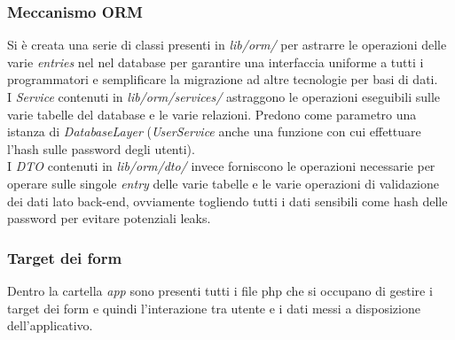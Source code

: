 \subsubsection{Meccanismo ORM}
Si è creata una serie di classi presenti in \textit{lib/orm/} per astrarre le operazioni delle varie \textit{entries} nel nel database per garantire una interfaccia uniforme a tutti i programmatori e semplificare la migrazione ad altre tecnologie per basi di dati.\\
I \textit{Service} contenuti in \textit{lib/orm/services/} astraggono le operazioni eseguibili sulle varie tabelle del database e le varie relazioni. Predono come parametro una istanza di \textit{DatabaseLayer} (\textit{UserService} anche una funzione con cui effettuare l'hash sulle password degli utenti).\\
I \textit{DTO} contenuti in \textit{lib/orm/dto/} invece forniscono le operazioni necessarie per operare sulle singole \textit{entry} delle varie tabelle e le varie operazioni di validazione dei dati lato back-end, ovviamente togliendo tutti i dati sensibili come hash delle password per evitare potenziali leaks.

\subsubsection{Target dei form}
Dentro la cartella \textit{app} sono presenti tutti i file php che si occupano di gestire i target dei form e quindi l'interazione tra utente e i dati messi a disposizione dell'applicativo.